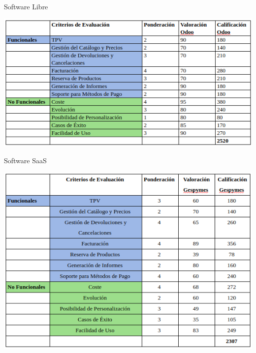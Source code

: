 \documentclass{beamer}
\begin{document}
\begin{frame}{Software Libre}

\begin{center}
	\includegraphics[scale=0.3]{imagenes/EvOdoo.png}
\end{center}
	
\end{frame}
	



\begin{frame}{Software SaaS}

\begin{center}
	\includegraphics[scale=0.3]{imagenes/GespymesEv.png}
\end{center}
	
\end{frame}
\end{document}
